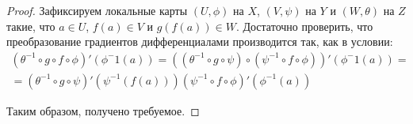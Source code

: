 \begin{proof}
	Зафиксируем локальные карты $(U, \phi)$ на $X$, $(V, \psi)$ на $Y$ и $(W, \theta)$ на $Z$ такие, что $a \in U$, $f(a) \in V$ и $g(f(a)) \in W$. Достаточно проверить, что преобразование градиентов дифференциалами производится так, как в условии:
	\begin{multline*}
		(\theta^{-1}\circ g \circ f \circ \phi)'(\phi^-1(a)) = \left((\theta^{-1}\circ g \circ \psi) \circ (\psi^{-1} \circ f \circ \phi)\right)'(\phi^-1(a)) = \\
		=(\theta^{-1}\circ g \circ \psi)'\left(\psi^{-1}(f(a))\right)(\psi^{-1} \circ f \circ \phi)'(\phi^{-1}(a))
	\end{multline*}
	
	Таким образом, получено требуемое.
\end{proof}